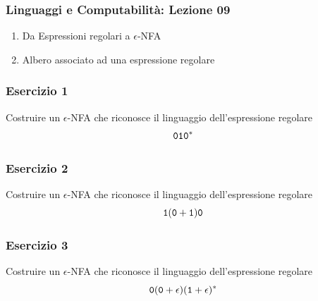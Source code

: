 




\begin{frame}[fragile]
	\frametitle{Linguaggi e Computabilità: Lezione 09}
\begin{enumerate}
\item
Da Espressioni regolari a $\epsilon$-NFA
\item
Albero associato ad una espressione regolare
\end{enumerate}
\end{frame}

\begin{frame}
\frametitle{Esercizio 1}
Costruire un $\epsilon$-NFA che riconosce il linguaggio dell'espressione regolare
\[
	\mathtt{0}\mathtt{1}\mathtt{0}{}^{\ast}
\]
\end{frame}

\begin{frame}
\frametitle{Esercizio 2}
Costruire un $\epsilon$-NFA che riconosce il linguaggio dell'espressione regolare
\[
	\mathtt{1}(\mathtt{0} + \mathtt{1})\mathtt{0}
\]
\end{frame}

\begin{frame}
\frametitle{Esercizio 3}
Costruire un $\epsilon$-NFA che riconosce il linguaggio dell'espressione regolare
\[
	\mathtt{0}(\mathtt{0} + \epsilon)(\mathtt{1} + \epsilon){}^{\ast}
\]
\end{frame}



